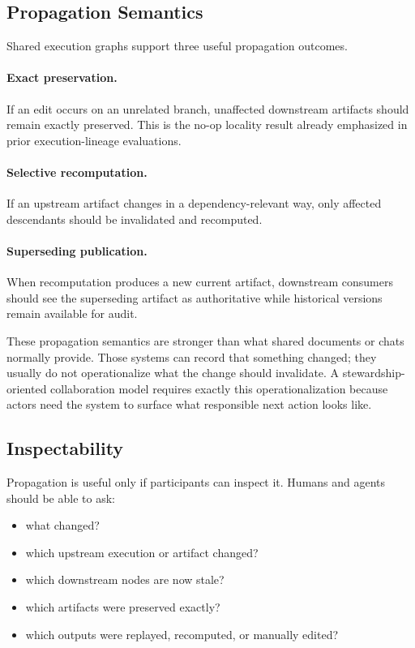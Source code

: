 \documentclass{article}
\begin{document}
\subsection{Propagation Semantics}

Shared execution graphs support three useful propagation outcomes.

\paragraph{Exact preservation.}
If an edit occurs on an unrelated branch, unaffected downstream artifacts should remain exactly preserved. This is the no-op locality result already emphasized in prior execution-lineage evaluations.

\paragraph{Selective recomputation.}
If an upstream artifact changes in a dependency-relevant way, only affected descendants should be invalidated and recomputed.

\paragraph{Superseding publication.}
When recomputation produces a new current artifact, downstream consumers should see the superseding artifact as authoritative while historical versions remain available for audit.

These propagation semantics are stronger than what shared documents or chats normally provide. Those systems can record that something changed; they usually do not operationalize what the change should invalidate. A stewardship-oriented collaboration model requires exactly this operationalization because actors need the system to surface what responsible next action looks like.

\subsection{Inspectability}

Propagation is useful only if participants can inspect it. Humans and agents should be able to ask:
\begin{itemize}
\item what changed?
\item which upstream execution or artifact changed?
\item which downstream nodes are now stale?
\item which artifacts were preserved exactly?
\item which outputs were replayed, recomputed, or manually edited?
\end{itemize}
\end{document}
